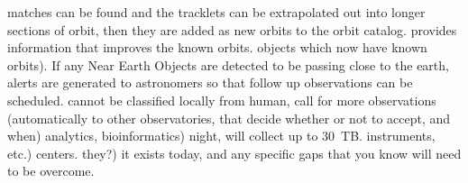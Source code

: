 \documentclass[times]{cpeauth}
\begin{document}
matches can be found and the tracklets can be extrapolated out into longer
sections of orbit, then they are added as new orbits to the orbit catalog.
%
provides information that improves the known orbits.
%
objects which now have known orbits). If any Near Earth Objects are detected to
be passing close to the earth, alerts are generated to astronomers so that
follow up observations can be scheduled.
%
cannot be classified locally
from
human, call for more observations (automatically to other observatories, that
decide whether or not to accept, and when)
%
%
%
%
analytics, bioinformatics)
%
%
night, will collect up to 30~TB.
%
instruments, etc.)
%
%
%
%
%
%
%
%
%
%
centers.
%
they?)
%
%
it exists today, and any specific gaps that you know will need to be overcome.
%
%
%
%
%
%
%
%
\end{document}
